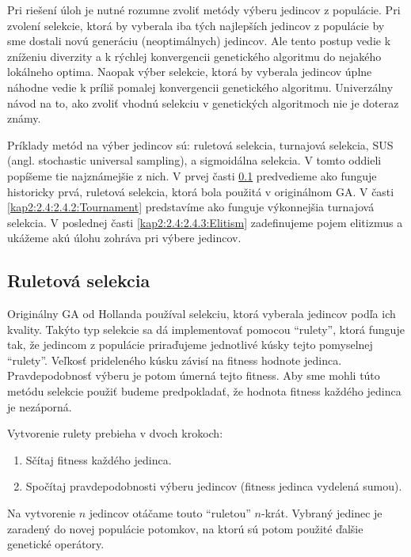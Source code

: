 Pri riešení úloh je nutné rozumne zvoliť metódy výberu jedincov z populácie. Pri zvolení selekcie, ktorá by vyberala iba tých najlepších jedincov z populácie by sme dostali novú generáciu (neoptimálnych) jedincov. Ale tento postup vedie k zníženiu diverzity a k rýchlej konvergencii genetického algoritmu do nejakého lokálneho optima. Naopak výber selekcie, ktorá by vyberala jedincov úplne náhodne vedie k príliš pomalej konvergencii genetického algoritmu. Univerzálny návod na to, ako zvoliť vhodnú selekciu v genetických algoritmoch nie je doteraz známy.

Príklady metód na výber jedincov sú: ruletová selekcia, turnajová selekcia, SUS (angl. stochastic universal sampling), a sigmoidálna selekcia. V tomto oddieli popíšeme tie najznámejšie z nich. V prvej časti \ref{kap2:2.4:2.4.1:RoulletteWheel} predvedieme ako funguje historicky prvá, ruletová selekcia, ktorá bola použitá v originálnom GA. V časti \ref{kap2:2.4:2.4.2:Tournament} predstavíme ako funguje výkonnejšia turnajová selekcia. V poslednej časti \ref{kap2:2.4:2.4.3:Elitism} zadefinujeme pojem elitizmus a ukážeme akú úlohu zohráva pri výbere jedincov.

\subsection{Ruletová selekcia}\label{kap2:2.4:2.4.1:RoulletteWheel}
Originálny GA od Hollanda používal selekciu, ktorá vyberala jedincov podľa ich kvality. Takýto typ selekcie sa dá implementovať pomocou ``rulety'', ktorá funguje tak, že jedincom z populácie priraďujeme jednotlivé kúsky tejto pomyselnej ``rulety''. Veľkosť prideleného kúsku závisí na fitness hodnote jedinca. Pravdepodobnosť výberu je potom úmerná tejto fitness. Aby sme mohli túto metódu selekcie použiť budeme predpokladať, že hodnota fitness každého jedinca je nezáporná.

Vytvorenie rulety prebieha v dvoch krokoch:
\begin{enumerate}
\item Sčítaj fitness každého jedinca.
\item Spočítaj pravdepodobnosti výberu jedincov (fitness jedinca vydelená sumou).
\end{enumerate}
Na vytvorenie $n$ jedincov otáčame touto ``ruletou'' $n$-krát. Vybraný jedinec je zaradený do novej populácie potomkov, na ktorú sú potom použité ďalšie genetické operátory.
